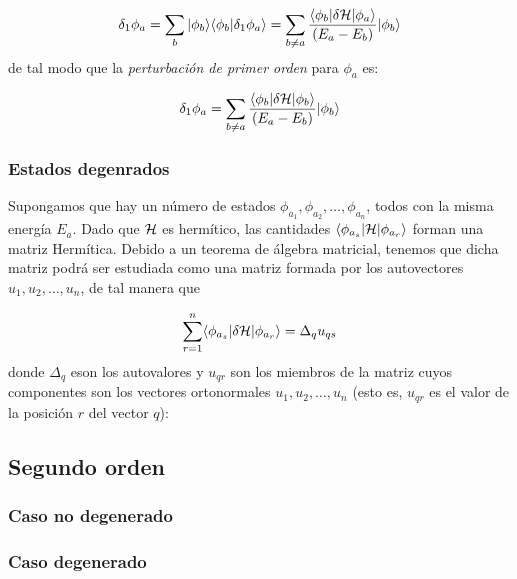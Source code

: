 \begin{equation}
    \delta_1 \phi_a = \sum_b |\phi_b \rangle \langle \phi_b | \delta_1 \phi_a \rangle = \sum_{b \neq a} \frac{\langle \phi_b |\delta \mathcal{H} |\phi_a \rangle}{(E_a-E_b)} |\phi_b \rangle
\end{equation}
de tal modo que la \textit{perturbación de primer orden} para $\phi_a$ es:

\begin{equation}
    \delta_1 \phi_a = \sum_{b\neq a} \frac{\langle \phi_b |\delta \mathcal{H} |\phi_b \rangle}{(E_a - E_b)}|\phi_b \rangle
\end{equation}

\subsubsection{Estados degenrados}

Supongamos que hay un número de estados $\phi_{a_1}, \phi_{a_2},\ldots, \phi_{a_n}$, todos con la misma energía $E_a$. Dado que $\mathcal{H}$ es hermítico, las cantidades $\langle \phi_{a_s} |\mathcal{H} |\phi_{a_r}\rangle$ forman una matriz Hermítica. Debido a un teorema de álgebra matricial, tenemos que  dicha matriz podrá ser estudiada como una matriz formada por los autovectores $u_1,u_2,\ldots,u_n$, de tal manera que
 
\begin{equation}
    \sum_{r=1}^n \langle \phi_{a_s} |\delta \mathcal{H} | \phi_{a_r} \rangle = \Delta_q u_{qs}
\end{equation}
donde $\Delta_q$ eson los autovalores y $u_{qr}$ son los miembros de la matriz cuyos componentes son los vectores ortonormales $u_1,u_2,\ldots,u_n$ (esto es, $u_{qr}$ es el valor de la posición $r$ del vector $q$):


\subsection{Segundo orden} \label{Subsec:A-02-02}

\subsubsection{Caso no degenerado}

\subsubsection{Caso degenerado}


